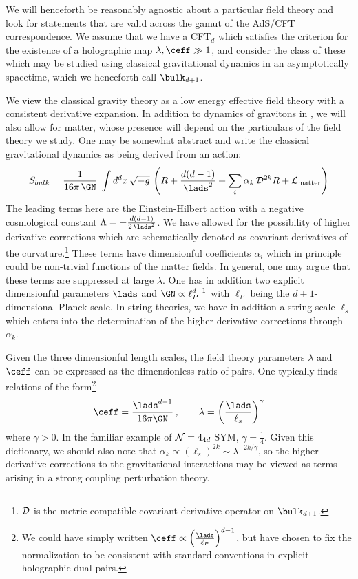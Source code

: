 \documentclass[12pt,openany]{book}
\begin{document}
We will henceforth be reasonably agnostic about a particular field theory and look for statements that are valid across the gamut of the AdS/CFT correspondence. We assume that we have a CFT$_d$ which  satisfies the criterion for the existence of a holographic map $\lambda, \ceff \gg 1 $, and consider the class of these which may be studied using classical gravitational dynamics in an asymptotically  spacetime, which we henceforth call $\bulk_{d+1}$.

We view the classical gravity theory as a low energy effective field theory with a consistent derivative expansion. In addition to dynamics of gravitons in , we will also allow for matter, whose presence will depend on the particulars of the field theory we study. One may be somewhat abstract and write the classical gravitational dynamics as being derived from an action:
%
\begin{equation}
S_{bulk } = \frac{1}{16\pi\, \GN} \; \int d^dx \, \sqrt{-g}\, \left(R +\frac{d(d-1)}{\lads^2} +  \sum_i  \alpha_k\,  \mathcal{D}^{2k}R + {\cal L}_\text{matter} \right)
\label{eq:gravact}
\end{equation}
%
The leading terms here are the Einstein-Hilbert action with a negative cosmological constant $\Lambda = -\frac{d(d-1)}{2\,\lads^2}$.  We have allowed for the possibility of higher derivative corrections which are schematically denoted as covariant derivatives of the curvature.\footnote{ ${\cal D}$ is the metric compatible covariant derivative operator on $\bulk_{d+1}$.} These terms have dimensionful coefficients $\alpha_i$ which in principle could be non-trivial functions of the matter fields. In general, one may argue that these terms are suppressed at large $\lambda$. One has in addition two explicit dimensionful parameters
$\lads$ and $\GN \propto \ell_P^{d-1}$ with $\ell_P$ being the $d+1$-dimensional Planck scale. In string theories, we have in addition a string scale $\ell_s$ which enters into the determination of the higher derivative corrections through $\alpha_k$.

Given the three dimensionful length scales, the field theory parameters  $\lambda$ and $\ceff$ can be expressed as the dimensionless ratio of pairs. One typically finds relations of the form\footnote{ We could have simply written $\ceff \propto \left(\frac{\lads}{\ell_P}\right)^{d-1}$, but have chosen to fix the normalization to be consistent with standard conventions in explicit holographic dual pairs.}
%
\begin{equation}
\ceff = \frac{\lads^{d-1}}{16\pi \GN} \,,  \qquad \lambda = \left(\frac{\lads}{\ell_s}\right)^\gamma
\label{eq:dumap}
\end{equation}
%
where $\gamma >0$. In the familiar example of ${\cal N}=4_{4d}$ SYM, $\gamma = \frac{1}{4}$. Given this dictionary, we should also note that $\alpha_k \propto (\ell_s)^{2k} \sim \lambda^{-2k/\gamma}$, so the higher derivative corrections to the gravitational interactions may be viewed as terms arising in a strong coupling perturbation theory.
\end{document}
